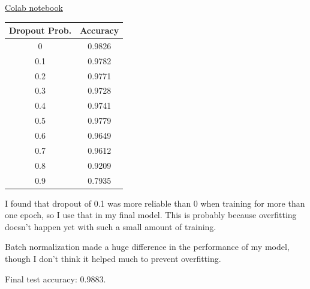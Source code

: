 \begin{solution}
\href{https://colab.research.google.com/drive/1MJ75loLyLXy434-q95DACQh9o5thCoMO?usp=sharing}{Colab notebook}

  \begin{tabular}{ c c }
    Dropout Prob. & Accuracy \\
    \hline
    0 & 0.9826 \\
    0.1 & 0.9782 \\
    0.2 & 0.9771 \\
    0.3 & 0.9728 \\
    0.4 & 0.9741 \\
    0.5 & 0.9779 \\
    0.6 & 0.9649 \\
    0.7 & 0.9612 \\
    0.8 & 0.9209 \\
    0.9 & 0.7935
  \end{tabular}

  I found that dropout of 0.1 was more reliable than 0 when training for more than one epoch, so I use that in my final model.
  This is probably because overfitting doesn't happen yet with such a small amount of training.

  Batch normalization made a huge difference in the performance of my model, though I don't think it helped much to prevent overfitting.

  Final test accuracy: 0.9883.
\end{solution}
